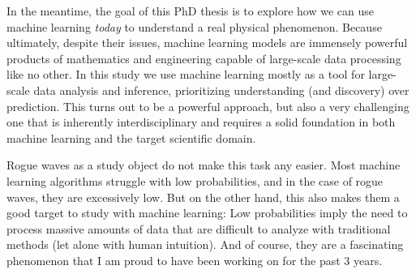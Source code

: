 In the meantime, the goal of this PhD thesis is to explore how we can use machine learning \emph{today} to understand a real physical phenomenon. Because ultimately, despite their issues, machine learning models are immensely powerful products of mathematics and engineering capable of large-scale data processing like no other. In this study we use machine learning mostly as a tool for large-scale data analysis and inference, prioritizing understanding (and discovery) over prediction. This turns out to be a powerful approach, but also a very challenging one that is inherently interdisciplinary and requires a solid foundation in both machine learning and the target scientific domain.

Rogue waves as a study object do not make this task any easier. Most machine learning algorithms struggle with low probabilities, and in the case of rogue waves, they are excessively low. But on the other hand, this also makes them a good target to study with machine learning: Low probabilities imply the need to process massive amounts of data that are difficult to analyze with traditional methods (let alone with human intuition). And of course, they are a fascinating phenomenon that I am proud to have been working on for the past 3 years.
